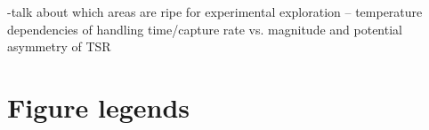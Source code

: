 \documentclass[11pt]{article}
\begin{document}
-talk about which areas are ripe for experimental exploration -- temperature dependencies of handling time/capture rate vs. magnitude and potential asymmetry of TSR








\newpage{}


\section*{Figure legends}

\end{document}
